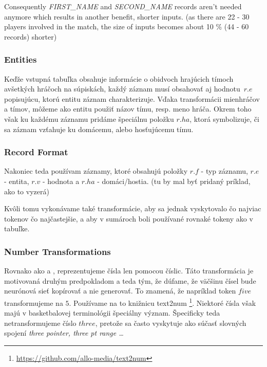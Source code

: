 Consequently \emph{FIRST\_NAME} and \emph{SECOND\_NAME} records aren't needed anymore which results in another benefit, shorter inputs. (as there are 22 - 30 players involved in the match, the size of inputs becomes about 10 \% (44 - 60 records) shorter)

\subsubsection{Entities}

Keďže vstupná tabuľka obsahuje informácie o obidvoch hrajúcich tímoch a\linebreak[4]všetkých hráčoch na súpiskách, každý záznam musí obsahovať aj hodnotu~$r.e$ popisujúcu, ktorú entitu záznam charakterizuje. Vďaka transformácii mien\linebreak[4]hráčov a tímov, môžeme ako entitu použiť názov tímu, resp. meno hráča. Okrem toho však ku každému záznamu pridáme špeciálnu položku $r.ha$, ktorá symbolizuje, či sa záznam vzťahuje ku domácemu, alebo hosťujúcemu tímu. 

\subsubsection{Record Format}

Nakoniec teda používam záznamy, ktoré obsahujú položky $r.f$ - typ záznamu, $r.e$ - entita, $r.v$ - hodnota a $r.ha$ - domáci/hostia. (tu by mal byť pridaný príklad, ako to vyzerá)

Kvôli tomu vykonávame také transformácie, aby sa jednak vyskytovalo čo najviac tokenov čo najčastejšie, a aby v sumároch boli používané rovnaké tokeny ako v tabuľke.

\subsubsection{Number Transformations} \label{num_trans_rw}

Rovnako ako \citep{wiseman2017} a \citep{puduppully2019datatotext}, reprezentujeme čísla len pomocou číslic. Táto transformácia je motivovaná druhým predpokladom a teda tým, že dúfame, že väčšinu čísel bude neurónová sieť kopírovať a nie generovať. To znamená, že napríklad token $five$ transformujeme na $5$. Používame na to knižnicu text2num \footnote[1]{\url{https://github.com/allo-media/text2num}}. Niektoré čísla však majú v basketbalovej terminológii špeciálny význam. Špecificky teda netransformujeme číslo $three$, pretože sa často vyskytuje ako súčasť slovných spojení \emph{three pointer, three pt range \dots}

